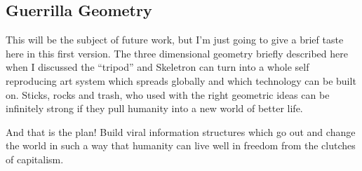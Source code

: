 \subsection{Guerrilla Geometry}\label{guerrilla-geometry}

This will be the subject of future work, but I'm just going to give a
brief taste here in this first version. The three dimensional geometry
briefly described here when I discussed the ``tripod'' and Skeletron can
turn into a whole self reproducing art system which spreads globally and
which technology can be built on. Sticks, rocks and trash, who used with
the right geometric ideas can be infinitely strong if they pull humanity
into a new world of better life.

And that is the plan! Build viral information structures which go out
and change the world in such a way that humanity can live well in
freedom from the clutches of capitalism.
